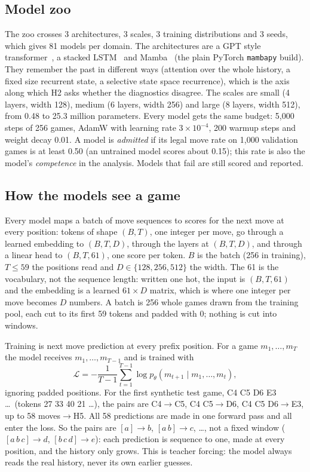 \documentclass[journal]{IEEEtran}
\begin{document}
\subsection{Model zoo}
The zoo crosses 3 architectures, 3 scales, 3 training distributions and 3 seeds, which gives 81 models per domain.
The architectures are a GPT style transformer~\cite{vaswani2017attention}, a stacked LSTM~\cite{hochreiter1997lstm}
and Mamba~\cite{gu2023mamba} (the plain PyTorch \texttt{mambapy} build). They remember the past in different ways
(attention over the whole history, a fixed size recurrent state, a selective state space recurrence), which is the
axis along which H2 asks whether the diagnostics disagree. The scales are small (4 layers, width 128), medium
(6 layers, width 256) and large (8 layers, width 512), from 0.48 to 25.3 million parameters. Every model gets the
same budget: 5,000 steps of 256 games, AdamW with learning rate $3\times10^{-4}$, 200 warmup steps and weight decay
0.01. A model is \emph{admitted} if its legal move rate on 1,000 validation games is at least 0.50 (an untrained
model scores about 0.15); this rate is also the model's \emph{competence} in the analysis. Models that fail are
still scored and reported.

\subsection{How the models see a game}
\label{sec:see}
Every model maps a batch of move sequences to scores for the next move at every position: tokens of shape
$(B, T)$, one integer per move, go through a learned embedding to $(B, T, D)$, through the layers at $(B, T, D)$,
and through a linear head to $(B, T, 61)$, one score per token. $B$ is the batch (256 in training), $T \le 59$ the
positions read and $D \in \{128, 256, 512\}$ the width. The 61 is the vocabulary, not the sequence length: written
one hot, the input is $(B, T, 61)$ and the embedding is a learned $61 \times D$ matrix, which is where one integer
per move becomes $D$ numbers. A batch is 256 whole games drawn from the training pool, each cut to its first 59
tokens and padded with 0; nothing is cut into windows.

Training is next move prediction at every prefix position. For a game $m_1,\dots,m_T$ the model receives
$m_1,\dots,m_{T-1}$ and is trained with
\begin{equation}
  \mathcal{L} = -\frac{1}{T-1}\sum_{t=1}^{T-1} \log p_\theta\!\left(m_{t+1}\mid m_1,\dots,m_t\right),
\end{equation}
ignoring padded positions. For the first synthetic test game, C4 C5 D6 E3 \dots\ (tokens 27 33 40 21 \dots), the
pairs are C4$\to$C5, C4 C5$\to$D6, C4 C5 D6$\to$E3, up to 58 moves$\to$H5. All 58 predictions are made in one
forward pass and all enter the loss. So the pairs are $[a] \to b$, $[a\,b] \to c$, \dots, not a fixed window
($[a\,b\,c] \to d$, $[b\,c\,d] \to e$): each prediction is sequence to one, made at every position, and the history
only grows. This is teacher forcing: the model always reads the real history, never its own earlier guesses.
\end{document}

